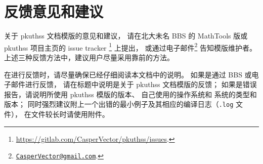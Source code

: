\section{反馈意见和建议}

关于 pkuthss 文档模版的意见和建议，
请在北大未名 BBS 的 MathTools 版或 pkuthss 项目主页的 issue tracker%
\footnote{\url{https://gitlab.com/CasperVector/pkuthss/issues}.}%
上提出，
或通过电子邮件\footnote%
{\href{mailto:CasperVector@gmail.com}{\texttt{CasperVector@gmail.com}}.}%
告知模版维护者。
上述三种反馈方法中，建议用户尽量采用靠前的方法。

在进行反馈时，请尽量确保已经仔细阅读本文档中的说明。
如果是通过 BBS 或电子邮件进行反馈，
请在标题中说明是关于 pkuthss 文档模版的反馈；
如果是错误报告，请说明所使用 pkuthss 模版的版本、
自己使用的操作系统和  系统的类型和版本；
同时强烈建议附上一个出错的最小例子及其相应的编译日志（\verb|.log| 文件），
在文件较长时请使用附件。


